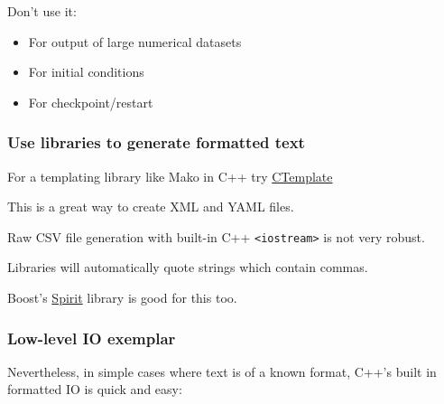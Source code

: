 Don't use it:

\begin{itemize}
\itemsep1pt\parskip0pt
\item
  For output of large numerical datasets
\item
  For initial conditions
\item
  For checkpoint/restart
\end{itemize}

\subsubsection{Use libraries to generate formatted
text}\label{use-libraries-to-generate-formatted-text}

For a templating library like Mako in C++ try
\href{https://code.google.com/p/ctemplate/}{CTemplate}

This is a great way to create XML and YAML files.

Raw CSV file generation with built-in C++
\texttt{\textless{}iostream\textgreater{}} is not very robust.

Libraries will automatically quote strings which contain commas.

Boost's \href{http://boost-spirit.com/home/}{Spirit} library is good for
this too.

\subsubsection{Low-level IO exemplar}\label{low-level-io-exemplar}

Nevertheless, in simple cases where text is of a known format, C++'s
built in formatted IO is quick and easy:

\begin{Shaded}
\begin{Highlighting}[]

  
     
\NormalTok{\}}
\end{Highlighting}
\end{Shaded}

\begin{Shaded}
\begin{Highlighting}[]

 
  \NormalTok{(} 
    \NormalTok{(} 
      \NormalTok{;}
    \NormalTok{\}}
  \NormalTok{\}}
\NormalTok{\}}
\end{Highlighting}
\end{Shaded}

